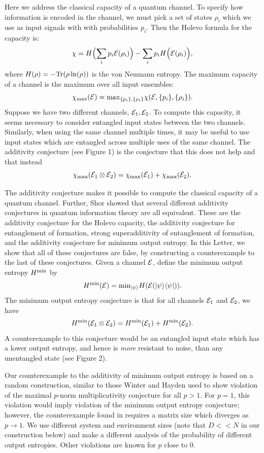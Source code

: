 \documentclass[aps,prl,amsmath,amssymb,amsfonts,superscriptaddress,floatfix]{revtex4}
\newcommand{\cmax}{\chi_{\rm max}}
\newcommand{\be}{\begin{equation}}
\newcommand{\ee}{\end{equation}}
\begin{document}
\begin{multicols}{2}
Here we address the classical capacity of a quantum channel.
To specify how information is encoded in the channel,
we must pick a set of states $\rho_i$ which we use as input
signals with
with probabilities
$p_i$.
Then the Holevo formula\cite{holevo} for the capacity is:
\be
\label{Hm}
\chi=H\Bigl(\sum_i p_i {\cal E}(\rho_i)\Bigr)-\sum_i p_i H\Bigl({\cal E}(\rho_i)\Bigr),
\ee
where $H(\rho)=-{\rm Tr}(\rho \ln(\rho))$ is the von Neumann entropy.
The maximum capacity of a channel is the maximum over all
input ensembles:
\be
\label{chimax}
\cmax({\cal E})={\rm max}_{\{p_i\},\{\rho_i\}}\chi({\cal E},\{p_i\},\{\rho_i\}).
\ee
Suppose we have two different channels, ${\cal E}_1,{\cal E}_2$.
To compute this capacity, it seems necessary
to consider entangled input states between the two channels.   Similarly,
when using the same channel multiple times, it may be useful to
use input states which are entangled across multiple
uses of the same channel.
The additivity conjecture (see Figure 1) is the conjecture that this does
not help and that instead
\be
\cmax({\cal E}_1 \otimes {\cal E}_2) = \cmax({\cal E}_1)+
\cmax({\cal E}_2).
\ee

The additivity conjecture makes it possible
to compute the classical capacity of a quantum channel.
Further, Shor\cite{equiv} showed that several different additivity conjectures
in quantum information theory
are all equivalent.  These are the additivity conjecture for the
Holevo capacity, the additivity conjecture for entanglement of formation\cite{eof}, strong
superadditivity of entanglement of formation\cite{sa},
and the additivity conjecture for minimum output entropy\cite{moec}.  In this
Letter, we show that all of these conjectures are false, by
constructing a counterexample to the last of these conjectures.
Given a channel ${\cal E}$, define the minimum output entropy $H^{\rm min}$ by
\be
H^{\rm min}({\cal E})={\rm min}_{|\psi\rangle} H({\cal E}(|\psi\rangle\langle\psi|)).
\ee
The minimum output entropy conjecture is that for all channels ${\cal E}_1$ and ${\cal E}_2$, we
have
\be
H^{\rm min}({\cal E}_1 \otimes {\cal E}_2)=H^{\rm min}({\cal E}_1)+H^{\rm min}({\cal E}_2).
\ee
A counterexample to this conjecture would be an
entangled input state which has a lower output entropy, and hence
is {\it more} resistant to noise, than any
unentangled state (see Figure 2).

Our counterexample to the additivity of minimum output
entropy is based on a random construction,
similar to those Winter and Hayden used to
show violation of the maximal $p$-norm multiplicativity conjecture for all
$p>1$\cite{aw,ph,phaw}.  For $p=1$,
this violation would imply violation of the minimum output entropy conjecture; however, the
counterexample found in \cite{ph} requires a matrix size which diverges as $p\rightarrow 1$.
We use different system and environment sizes (note that $D<<N$ in our construction
below) and make a different analysis of the probability of different output entropies.
Other violations are known 
for $p$ close to $0$\cite{smallp}.


\end{multicols}
\end{document}
